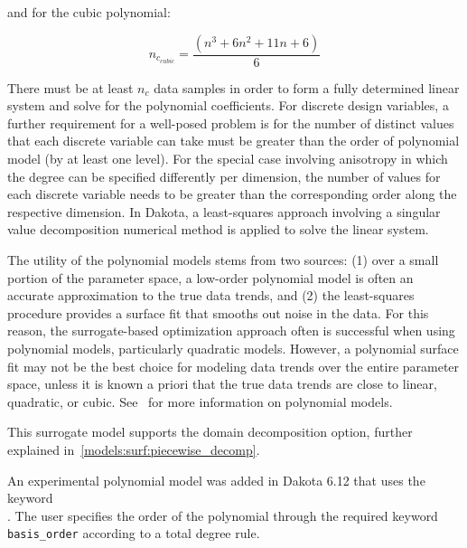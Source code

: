 and for the cubic polynomial:

\begin{equation}
  n_{c_{cubic}}=\frac{(n^{3}+6 n^{2}+11 n+6)}{6}
  \label{models:surf:equation06}
\end{equation}

There must be at least $n_{c}$ data samples in order to form a fully
determined linear system and solve for the polynomial coefficients. For
discrete design variables, a further requirement for a well-posed
problem is for the number of distinct values that each discrete
variable can take must be greater than the order of polynomial model
(by at least one level). For the special case involving anisotropy in
which the degree can be specified differently per dimension, the number
of values for each discrete variable needs to be greater than the 
corresponding order along the respective dimension. In Dakota, a
least-squares approach involving a singular value decomposition
numerical method is applied to solve the linear system.

The utility of the polynomial models stems from two sources: (1) over
a small portion of the parameter space, a low-order polynomial model
is often an accurate approximation to the true data trends, and (2)
the least-squares procedure provides a surface fit that smooths out
noise in the data. For this reason, the surrogate-based optimization
approach often is successful when using polynomial models,
particularly quadratic models. However, a polynomial surface fit may
not be the best choice for modeling data trends over the entire
parameter space, unless it is known a priori that the true data trends
are close to linear, quadratic, or cubic. See~\cite{Mye95} for more
information on polynomial models.

This surrogate model supports the domain decomposition option, further explained in~\ref{models:surf:piecewise_decomp}.

An experimental polynomial model was added in Dakota 6.12 that 
uses the keyword \\
. The user specifies the order of the
polynomial through the required keyword \texttt{basis\_order}
according to a total degree rule.

